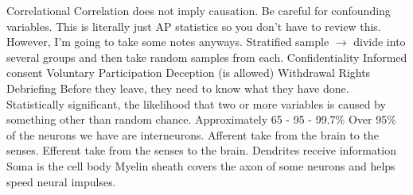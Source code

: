 \markdownRendererUlItem Correlational\markdownRendererInterblockSeparator
{}\markdownRendererUlBeginTight
\markdownRendererUlItem Correlation does not imply causation.\markdownRendererUlItemEnd 
\markdownRendererUlItem Be careful for confounding variables.\markdownRendererUlItemEnd 
\markdownRendererUlEndTight \markdownRendererUlItemEnd 
\markdownRendererUlEndTight \markdownRendererInterblockSeparator
{}\markdownRendererInterblockSeparator
{}This is literally just AP statistics so you don't have to review this. However, I'm going to take some notes anyways.\markdownRendererInterblockSeparator
{}\markdownRendererUlBeginTight
\markdownRendererUlItem Stratified sample $\rightarrow$ divide into several groups and then take random samples from each.\markdownRendererUlItemEnd 
\markdownRendererUlEndTight \markdownRendererInterblockSeparator
{}\markdownRendererInterblockSeparator
{}\markdownRendererUlBegin
\markdownRendererUlItem Confidentiality\markdownRendererUlItemEnd 
\markdownRendererUlItem Informed consent\markdownRendererUlItemEnd 
\markdownRendererUlItem Voluntary Participation\markdownRendererUlItemEnd 
\markdownRendererUlItem Deception (is allowed)\markdownRendererUlItemEnd 
\markdownRendererUlItem Withdrawal Rights\markdownRendererUlItemEnd 
\markdownRendererUlItem Debriefing\markdownRendererInterblockSeparator
{}\markdownRendererUlBeginTight
\markdownRendererUlItem Before they leave, they need to know what they have done.\markdownRendererUlItemEnd 
\markdownRendererUlEndTight \markdownRendererUlItemEnd 
\markdownRendererUlItem Statistically significant, the likelihood that two or more variables is caused by something other than random chance.\markdownRendererUlItemEnd 
\markdownRendererUlEnd \markdownRendererInterblockSeparator
{}\markdownRendererInterblockSeparator
{}Approximately 65 - 95 - 99.7\%\markdownRendererInterblockSeparator
{}\markdownRendererInterblockSeparator
{}\markdownRendererUlBeginTight
\markdownRendererUlItem Over 95\% of the neurons we have are interneurons.\markdownRendererUlItemEnd 
\markdownRendererUlItem Afferent take from the brain to the senses.\markdownRendererUlItemEnd 
\markdownRendererUlItem Efferent take from the senses to the brain.\markdownRendererUlItemEnd 
\markdownRendererUlItem Dendrites receive information\markdownRendererUlItemEnd 
\markdownRendererUlItem Soma is the cell body\markdownRendererUlItemEnd 
\markdownRendererUlItem Myelin sheath covers the axon of some neurons and helps speed neural impulses.\markdownRendererUlItemEnd 
